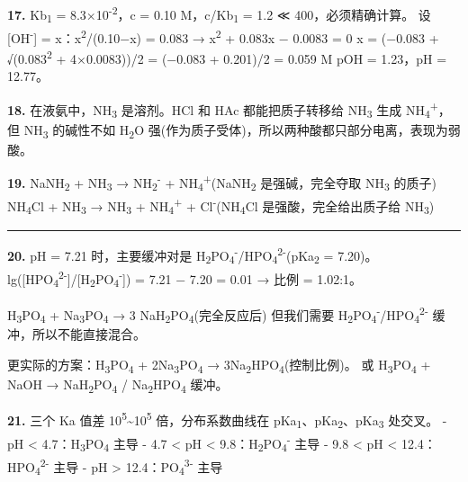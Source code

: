 \textbf{17.} Kb\textsubscript{1} = 8.3×10\textsuperscript{-2}，c = 0.10 M，c/Kb\textsubscript{1} = 1.2 ≪ 400，必须精确计算。
设 {[}OH\textsuperscript{-}{]} = x：x\textsuperscript{2}/(0.10−x) = 0.083 → x\textsuperscript{2} + 0.083x − 0.0083 = 0
x = (−0.083 + √(0.083\textsuperscript{2} + 4×0.0083))/2 = (−0.083 + 0.201)/2 = 0.059 M
pOH = 1.23，pH = 12.77。

\textbf{18.} 在液氨中，NH\textsubscript{3} 是溶剂。HCl 和 HAc 都能把质子转移给 NH\textsubscript{3} 生成 NH\textsubscript{4}\textsuperscript{+}，但 NH\textsubscript{3} 的碱性不如 H\textsubscript{2}O 强(作为质子受体)，所以两种酸都只部分电离，表现为弱酸。

\textbf{19.} NaNH\textsubscript{2} + NH\textsubscript{3} → NH\textsubscript{2}\textsuperscript{-} + NH\textsubscript{4}\textsuperscript{+}(NaNH\textsubscript{2} 是强碱，完全夺取 NH\textsubscript{3} 的质子)
NH\textsubscript{4}Cl + NH\textsubscript{3} → NH\textsubscript{3} + NH\textsubscript{4}\textsuperscript{+} + Cl\textsuperscript{-}(NH\textsubscript{4}Cl 是强酸，完全给出质子给 NH\textsubscript{3})

\begin{center}\rule{0.5\linewidth}{0.5pt}\end{center}

\textbf{20.} pH = 7.21 时，主要缓冲对是 H\textsubscript{2}PO\textsubscript{4}\textsuperscript{-}/HPO\textsubscript{4}\textsuperscript{2-}(pKa\textsubscript{2} = 7.20)。
lg({[}HPO\textsubscript{4}\textsuperscript{2-}{]}/{[}H\textsubscript{2}PO\textsubscript{4}\textsuperscript{-}{]}) = 7.21 − 7.20 = 0.01 → 比例 = 1.02:1。

H\textsubscript{3}PO\textsubscript{4} + Na\textsubscript{3}PO\textsubscript{4} → 3 NaH\textsubscript{2}PO\textsubscript{4}(完全反应后)
但我们需要 H\textsubscript{2}PO\textsubscript{4}\textsuperscript{-}/HPO\textsubscript{4}\textsuperscript{2-} 缓冲，所以不能直接混合。

更实际的方案：H\textsubscript{3}PO\textsubscript{4} + 2Na\textsubscript{3}PO\textsubscript{4} → 3Na\textsubscript{2}HPO\textsubscript{4}(控制比例)。
或 H\textsubscript{3}PO\textsubscript{4} + NaOH → NaH\textsubscript{2}PO\textsubscript{4} / Na\textsubscript{2}HPO\textsubscript{4} 缓冲。

\textbf{21.} 三个 Ka 值差 10\textsuperscript{5}\textasciitilde10\textsuperscript{5} 倍，分布系数曲线在 pKa\textsubscript{1}、pKa\textsubscript{2}、pKa\textsubscript{3} 处交叉。
- pH \textless{} 4.7：H\textsubscript{3}PO\textsubscript{4} 主导
- 4.7 \textless{} pH \textless{} 9.8：H\textsubscript{2}PO\textsubscript{4}\textsuperscript{-} 主导
- 9.8 \textless{} pH \textless{} 12.4：HPO\textsubscript{4}\textsuperscript{2-} 主导
- pH \textgreater{} 12.4：PO\textsubscript{4}\textsuperscript{3-} 主导

